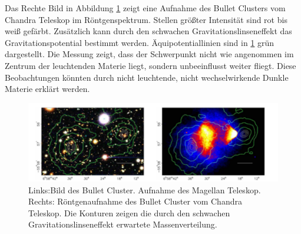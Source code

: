 Das Rechte Bild in Abbildung \ref{fig:BulletC} zeigt eine Aufnahme des Bullet Clusters vom Chandra Teleskop im Röntgenspektrum.
Stellen größter Intensität sind rot bis weiß gefärbt. 
Zusätzlich kann durch den schwachen Gravitationslinseneffekt das Gravitationspotential bestimmt werden.
Äquipotentiallinien sind in \ref{fig:BulletC} grün dargestellt.
Die Messung zeigt, dass der Schwerpunkt nicht wie angenommen im Zentrum der leuchtenden Materie liegt, sondern unbeeinflusst weiter fliegt.
Diese Beobachtungen könnten durch nicht leuchtende, nicht wechselwirkende Dunkle Materie erklärt werden.\cite{BulletC}


\begin{figure}[!b]
\begin{center}
\includegraphics[width=\textwidth]{./fig/Bullet.pdf}
\end{center}
\caption{Links:Bild des Bullet Cluster. 
Aufnahme des Magellan Teleskop.
Rechts: Röntgenaufnahme des Bullet Cluster vom Chandra Teleskop.
Die Konturen zeigen die durch den schwachen Gravitationslinseneffekt erwartete Massenverteilung.\cite{BulletC}}
\label{fig:BulletC}
\end{figure}



